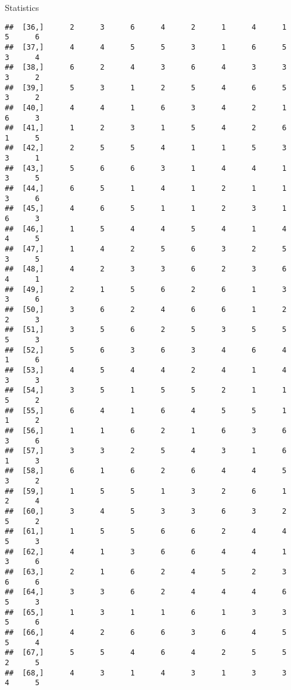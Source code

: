 \documentclass[
  ignorenonframetext,
]{beamer}
\begin{document}
\begin{frame}[fragile]{Statistics}
\begin{verbatim}
##  [36,]      2      3      6      4      2      1      4      1      5      6
##  [37,]      4      4      5      5      3      1      6      5      3      4
##  [38,]      6      2      4      3      6      4      3      3      3      2
##  [39,]      5      3      1      2      5      4      6      5      3      2
##  [40,]      4      4      1      6      3      4      2      1      6      3
##  [41,]      1      2      3      1      5      4      2      6      1      5
##  [42,]      2      5      5      4      1      1      5      3      3      1
##  [43,]      5      6      6      3      1      4      4      1      3      5
##  [44,]      6      5      1      4      1      2      1      1      3      6
##  [45,]      4      6      5      1      1      2      3      1      6      3
##  [46,]      1      5      4      4      5      4      1      4      4      5
##  [47,]      1      4      2      5      6      3      2      5      3      5
##  [48,]      4      2      3      3      6      2      3      6      4      1
##  [49,]      2      1      5      6      2      6      1      3      3      6
##  [50,]      3      6      2      4      6      6      1      2      2      3
##  [51,]      3      5      6      2      5      3      5      5      5      3
##  [52,]      5      6      3      6      3      4      6      4      1      6
##  [53,]      4      5      4      4      2      4      1      4      3      3
##  [54,]      3      5      1      5      5      2      1      1      5      2
##  [55,]      6      4      1      6      4      5      5      1      1      2
##  [56,]      1      1      6      2      1      6      3      6      3      6
##  [57,]      3      3      2      5      4      3      1      6      1      3
##  [58,]      6      1      6      2      6      4      4      5      3      2
##  [59,]      1      5      5      1      3      2      6      1      2      4
##  [60,]      3      4      5      3      3      6      3      2      5      2
##  [61,]      1      5      5      6      6      2      4      4      5      3
##  [62,]      4      1      3      6      6      4      4      1      3      6
##  [63,]      2      1      6      2      4      5      2      3      6      6
##  [64,]      3      3      6      2      4      4      4      6      5      3
##  [65,]      1      3      1      1      6      1      3      3      5      6
##  [66,]      4      2      6      6      3      6      4      5      5      4
##  [67,]      5      5      4      6      4      2      5      5      2      5
##  [68,]      4      3      1      4      3      1      3      3      4      5

\end{verbatim}
\end{frame}
\end{document}

